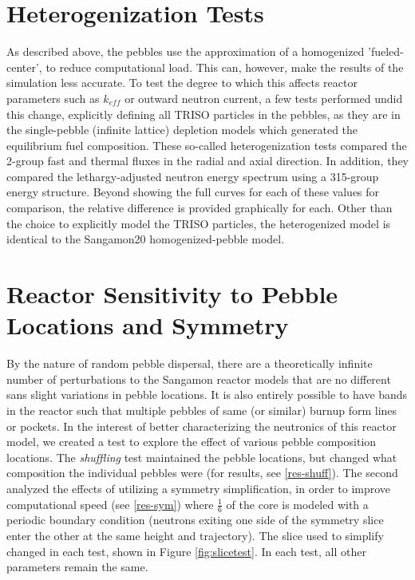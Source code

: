 \section{Heterogenization Tests}
\label{het-test-meth}

As described above, the pebbles use the approximation of a homogenized 'fueled-center', to reduce computational load.  This can, however, make the results of the simulation less accurate.  To test the degree to which this affects reactor parameters such as $k_{eff}$ or outward neutron current, a few tests performed undid this change, explicitly defining all TRISO particles in the pebbles, as they are in the single-pebble (infinite lattice) depletion models which generated the equilibrium fuel composition.  These so-called heterogenization tests compared the 2-group fast and thermal fluxes in the radial and axial direction.  In addition, they compared the lethargy-adjusted neutron energy spectrum using a 315-group energy structure.  Beyond showing the full curves for each of these values for comparison, the relative difference is provided graphically for each.  Other than the choice to explicitly model the TRISO particles, the heterogenized model is identical to the Sangamon20 homogenized-pebble model.

\section{Reactor Sensitivity to Pebble Locations and Symmetry}
\label{meth-sens}

By the nature of random pebble dispersal, there are a theoretically infinite number of perturbations to the Sangamon reactor models that are no different sans slight variations in pebble locations.  It is also entirely possible to have bands in the reactor such that multiple pebbles of same (or similar) burnup form lines or pockets.  In the interest of better characterizing the neutronics of this reactor model, we created a test to explore the effect of various pebble composition locations.  The \emph{shuffling} test maintained the pebble locations, but changed what composition the individual pebbles were (for results, see \autoref{res-shuff}).  The second analyzed the effects of utilizing a symmetry simplification, in order to improve computational speed (see \autoref{res-sym}) where $\frac{1}{6}$ of the core is modeled with a periodic boundary condition (neutrons exiting one side of the symmetry slice enter the other at the same height and trajectory).  The slice used to simplify changed in each test, shown in Figure \ref{fig:slicetest}.  In each test, all other parameters remain the same.

